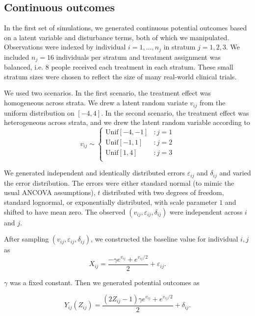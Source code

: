 \documentclass[12pt]{article}
\begin{document}
\subsection{Continuous outcomes}

In the first set of simulations, we generated continuous potential outcomes based on a latent variable and disturbance terms, both of which we manipulated.
Observations were indexed by individual $i = 1, \dots, n_j$ in stratum $j=1, 2, 3$.
We included $n_j=16$ individuals per stratum and treatment assignment was balanced, i.e. 8 people received each treatment in each stratum.
These small stratum sizes were chosen to reflect the size of many real-world clinical trials.

We used two scenarios.
In the first scenario, the treatment effect was homogeneous across strata.
We drew a latent random variate $v_{ij}$ from the uniform distribution on $[-4, 4]$.
In the second scenario, the treatment effect was heterogeneous across strata, and we drew the latent random variable according to
\begin{equation}
   v_{ij} \sim \left\{
     \begin{array}{lr}
       \text{Unif}[-4, -1] & : j=1\\
       \text{Unif}[-1, 1] & : j=2\\
       \text{Unif}[1, 4] & : j=3\\
     \end{array}
   \right.
\end{equation} 

We generated independent and identically distributed errors $\varepsilon_{ij}$ and $\delta_{ij}$ and varied the error distribution. 
The errors were either standard normal (to mimic the usual ANCOVA assumptions),
$t$ distributed with two degrees of freedom,
standard lognormal,
or exponentially distributed, with scale parameter $1$ and shifted to have mean zero.
The observed $(v_{ij}, \varepsilon_{ij}, \delta_{ij})$ were independent across $i$ and $j$.

After sampling $(v_{ij}, \varepsilon_{ij}, \delta_{ij})$, we constructed the baseline value for individual $i,j$ as 
\begin{equation}
X_{ij} = \frac{-\gamma e^{v_{ij}} + e^{v_{ij}/2}}{2} + \varepsilon_{ij}.
\end{equation}

\noindent $\gamma$ was a fixed constant.
Then we generated potential outcomes as

\begin{equation}
Y_{ij}(Z_{ij}) = \frac{(2Z_{ij} - 1)\gamma e^{v_{ij}} + e^{v_{ij}/2}}{2} + \delta_{ij}.
\end{equation}
\end{document}

